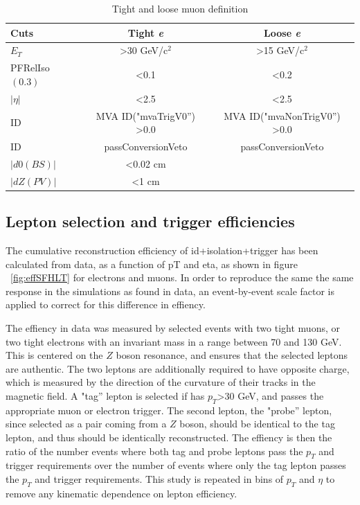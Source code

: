 \begin{table}[hbtp]\footnotesize
\centering
\begin{tabular}{|l|c|c|}
\hline\hline
Cuts & Tight \emph{e} & Loose \emph{e} \\
\hline
$E_{T}$ & \textgreater 30 GeV/c$^2$ & \textgreater 15 GeV/c$^2$ \\
\hline
PFRelIso$(0.3)$ & \textless 0.1 & \textless 0.2 \\
\hline
$|\eta|$ & \textless 2.5 & \textless 2.5 \\
\hline
ID & MVA ID("mvaTrigV0'') \textgreater 0.0 &  MVA ID("mvaNonTrigV0'') \textgreater 0.0\\
\hline
ID & passConversionVeto & passConversionVeto \\
\hline
$|d0(BS)|$ & \textless 0.02 cm & \\
\hline
$|dZ(PV)|$ & \textless 1 cm & \\
\hline\hline
\end{tabular}
\caption{Tight and loose muon definition}
\label{tab:TightLooseEleTable}
\end{table}


\subsection{Lepton selection and trigger efficiencies}
\label{trigger_efficiency_overview}

\par The cumulative reconstruction efficiency of id+isolation+trigger
has been calculated from data, as a function of pT and eta, as
shown in figure ~\ref{fig:effSFHLT} for electrons and muons.  In order
to reproduce the same the same response in the simulations as found in
data, an event-by-event scale factor is applied to correct for this
difference in effiency.  

\par The effiency in data was measured by selected events with two
tight muons, or two tight electrons with an invariant mass in a range
between 70 and 130 GeV.  This is centered on the $Z$ boson resonance,
and ensures that the selected leptons are authentic.  The two leptons
are additionally required to have opposite charge, which is measured
by the direction of the curvature of their tracks in the magnetic
field.  A "tag'' lepton is selected if has $p_{T}$>30 GeV, and passes
the appropriate muon or electron trigger.  The second lepton, the
"probe'' lepton, since selected as a pair coming from a $Z$ boson,
should be identical to the tag lepton, and thus should be identically
reconstructed.  The effiency is then the ratio of the number events where both
tag and probe leptons pass the $p_{T}$ and trigger requirements over
the number of events where only the tag lepton passes the $p_{T}$ and
trigger requirements.  This study is repeated in bins of $p_{T}$ and
$\eta$ to remove any kinematic dependence on lepton efficiency.  


